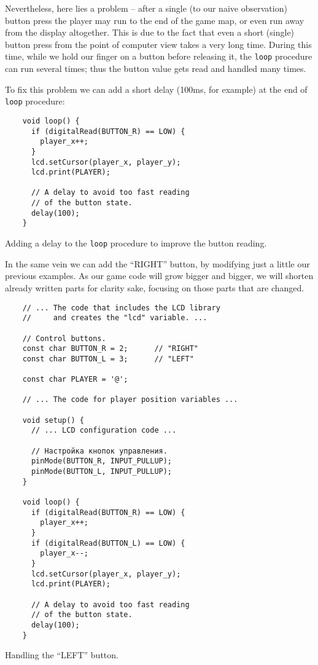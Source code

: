 \documentclass[../sparc.tex]{subfiles}
\begin{document}
Nevertheless, here lies a problem -- after a single (to our naive observation)
button press the player may run to the end of the game map, or even run away
from the display altogether.  This is due to the fact that even a short (single)
button press from the point of computer view takes a very long time.  During
this time, while we hold our finger on a button before releasing it, the
\texttt{loop} procedure can run several times; thus the button value
gets read and handled many times.

To fix this problem we can add a short delay (100ms, for example) at the end of
\texttt{loop} procedure:

\begin{listing}[H]
  \begin{verbatim}
    void loop() {
      if (digitalRead(BUTTON_R) == LOW) {
        player_x++;
      }
      lcd.setCursor(player_x, player_y);
      lcd.print(PLAYER);

      // A delay to avoid too fast reading
      // of the button state.
      delay(100);
    }
  \end{verbatim}
  \caption{Adding a delay to the \texttt{loop} procedure to improve the
    button reading.}
  \label{listing:game-dev-button-delay}
\end{listing}

In the same vein we can add the ``RIGHT'' button, by modifying just a little our
previous examples.  As our game code will grow bigger and bigger, we will
shorten already written parts for clarity sake, focusing on those parts that are
changed.

\begin{listing}[H]
  \begin{verbatim}
    // ... The code that includes the LCD library
    //     and creates the "lcd" variable. ...

    // Control buttons.
    const char BUTTON_R = 2;      // "RIGHT"
    const char BUTTON_L = 3;      // "LEFT"

    const char PLAYER = '@';

    // ... The code for player position variables ...

    void setup() {
      // ... LCD configuration code ...

      // Настройка кнопок управления.
      pinMode(BUTTON_R, INPUT_PULLUP);
      pinMode(BUTTON_L, INPUT_PULLUP);
    }

    void loop() {
      if (digitalRead(BUTTON_R) == LOW) {
        player_x++;
      }
      if (digitalRead(BUTTON_L) == LOW) {
        player_x--;
      }
      lcd.setCursor(player_x, player_y);
      lcd.print(PLAYER);

      // A delay to avoid too fast reading
      // of the button state.
      delay(100);
    }
  \end{verbatim}
  \caption{Handling the ``LEFT'' button.}
  \label{listing:game-dev-button-left}
\end{listing}
\end{document}
